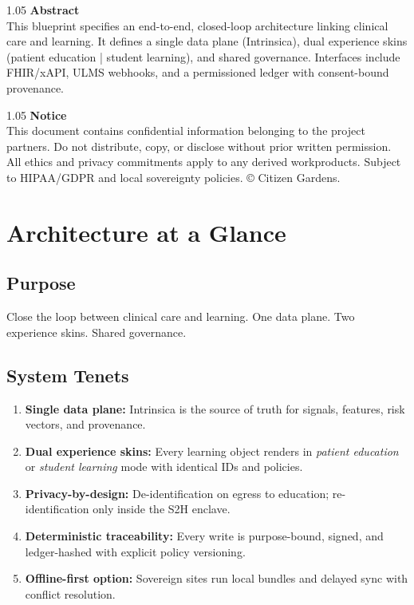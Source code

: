\documentclass[11pt]{article}
\theoremstyle{plain}
\begin{document}
\begin{titlepage}
  \vspace{1.2cm}

  \begin{spacing}{1.05}\small
  \textbf{Abstract} \\
  This blueprint specifies an end-to-end, closed-loop architecture linking clinical care and learning. It defines a single data plane (Intrinsica), dual experience skins (patient education | student learning), and shared governance. Interfaces include FHIR/xAPI, ULMS webhooks, and a permissioned ledger with consent-bound provenance.
  \end{spacing}

  \vfill

  \begin{spacing}{1.05}\footnotesize
  \textbf{Notice} \\
  This document contains confidential information belonging to the project partners. Do not distribute, copy, or disclose without prior written permission. All ethics and privacy commitments apply to any derived workproducts. Subject to HIPAA/GDPR and local sovereignty policies. © Citizen Gardens.
  \end{spacing}

\end{titlepage}




\newpage


\section{Architecture at a Glance}

\subsection{Purpose}
Close the loop between clinical care and learning. One data plane. Two experience skins. Shared governance.

\subsection{System Tenets}
\begin{enumerate}
  \item \textbf{Single data plane:} Intrinsica is the source of truth for signals, features, risk vectors, and provenance.
  \item \textbf{Dual experience skins:} Every learning object renders in \emph{patient education} or \emph{student learning} mode with identical IDs and policies.
  \item \textbf{Privacy-by-design:} De-identification on egress to education; re-identification only inside the S2H enclave.
  \item \textbf{Deterministic traceability:} Every write is purpose-bound, signed, and ledger-hashed with explicit policy versioning.
  \item \textbf{Offline-first option:} Sovereign sites run local bundles and delayed sync with conflict resolution.
\end{enumerate}
\end{document}
